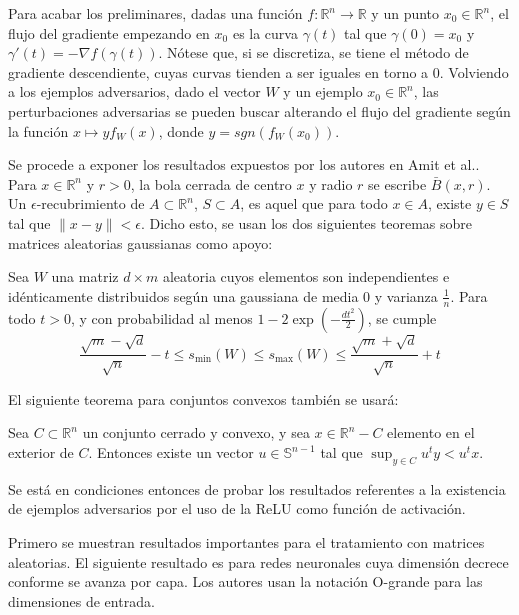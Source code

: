 Para acabar los preliminares, dadas una función $f: \mathbb{R}^n \to \mathbb{R}$ y un punto $x_0 \in \mathbb{R}^n$, el flujo del gradiente empezando en $x_0$ es la curva $\gamma(t)$ tal que $\gamma(0)=x_0$ y $\gamma'(t) = - \nabla f(\gamma(t))$. Nótese que, si se discretiza, se tiene el método de gradiente descendiente, cuyas curvas tienden a ser iguales en torno a $0$. Volviendo a los ejemplos adversarios, dado el vector $W$ y un ejemplo $x_0 \in \mathbb{R}^n$, las perturbaciones adversarias se pueden buscar alterando el flujo del gradiente según la función $x \mapsto y f_{W}(x)$, donde $y=sgn(f_{W}(x_0))$.

Se procede a exponer los resultados expuestos por los autores en Amit et al.\cite{FActivation}. Para $x \in \mathbb{R}^n$ y $r > 0$, la bola cerrada de centro $x$ y radio $r$ se escribe $\bar{B}(x,r)$. Un $\epsilon$-recubrimiento de $A \subset \mathbb{R}^n$, $S \subset A$, es aquel que para todo $x \in A$, existe $y \in S$ tal que $\|x-y \| < \epsilon$. Dicho esto, se usan los dos siguientes teoremas sobre matrices aleatorias gaussianas como apoyo:

\begin{teorema} \label{teom216}
Sea $W$ una matriz $d \times m$ aleatoria cuyos elementos son independientes e idénticamente distribuidos según una gaussiana de media $0$ y varianza $\frac{1}{n}$. Para todo $t>0$, y con probabilidad al menos $1-2 \exp \left(  - \frac{d t^2}{2}\right)$, se cumple
$$\frac{\sqrt{m}-\sqrt{d}}{\sqrt{n}} - t \leq s_{\text{min}}(W) \leq s_{\text{max}}(W) \leq \frac{\sqrt{m}+\sqrt{d}}{\sqrt{n}} + t$$
\end{teorema}

El siguiente teorema para conjuntos convexos también se usará:

\begin{teorema}
Sea $C \subset \mathbb{R}^n$ un conjunto cerrado y convexo, y sea $x \in \mathbb{R}^n - C$ elemento en el exterior de $C$. Entonces existe un vector $u \in \mathbb{S}^{n-1}$ tal que $\sup_{y \in C} u^{t}y < u^{t}x$.
\end{teorema}

Se está en condiciones entonces de probar los resultados referentes a la existencia de ejemplos adversarios por el uso de la ReLU como función de activación.

Primero se muestran resultados importantes para el tratamiento con matrices aleatorias. El siguiente resultado es para redes neuronales cuya dimensión decrece conforme se avanza por capa. Los autores usan la notación O-grande para las dimensiones de entrada.

